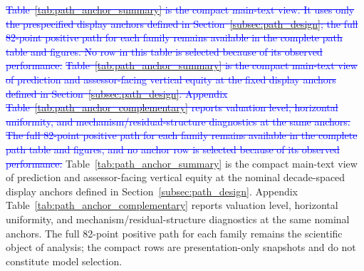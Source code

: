 \documentclass[10pt]{article}
\theoremstyle{definition}
\newcommand{\1}{\mathbf{1}}
\newcommand{\oldtext}[1]{\textcolor{blue}{\sout{#1}}}
\newcommand{\latesttext}[1]{\textcolor{latestPurple}{#1}}
\begin{document}
\oldtext{Table~\ref{tab:path_anchor_summary} is the compact main-text view. It uses only the prespecified display anchors defined in Section~\ref{subsec:path_design}; the full 82-point positive path for each family remains available in the complete path table and figures. No row in this table is selected because of its observed performance.}
\oldtext{Table~\ref{tab:path_anchor_summary} is the compact main-text view of prediction and assessor-facing vertical equity at the fixed display anchors defined in Section~\ref{subsec:path_design}. Appendix Table~\ref{tab:path_anchor_complementary} reports valuation level, horizontal uniformity, and mechanism/residual-structure diagnostics at the same anchors. The full 82-point positive path for each family remains available in the complete path table and figures, and no anchor row is selected because of its observed performance.}
\latesttext{Table~\ref{tab:path_anchor_summary} is the compact main-text view of prediction and assessor-facing vertical equity at the nominal decade-spaced display anchors defined in Section~\ref{subsec:path_design}. Appendix Table~\ref{tab:path_anchor_complementary} reports valuation level, horizontal uniformity, and mechanism/residual-structure diagnostics at the same nominal anchors. The full 82-point positive path for each family remains the scientific object of analysis; the compact rows are presentation-only snapshots and do not constitute model selection.}
\end{document}
